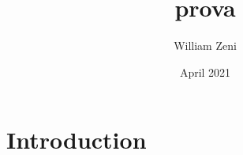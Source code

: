 \documentclass{article}
\title{prova}
\author{William Zeni}
\date{April 2021}
\begin{document}
\maketitle

\section{Introduction}
\end{document}
